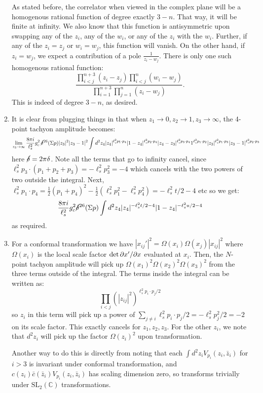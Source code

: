 \documentclass[11pt, class=article, crop=false]{standalone}
\begin{document}
\begin{enumerate}
 As stated before, the correlator when viewed in the complex plane will be a homogenous rational function of degree exactly $3-n$. That way, it will be finite at infinity. We also know that this function is antisymmetric upon swapping any of the $z_i$, any of the $w_i$, or any of the $z_i$ with the $w_i$. Further, if any of the $z_i = z_j$ or $w_i = w_j$, this function will vanish. On the other hand, if $z_i = w_j$, we expect a contribution of a pole $\frac1{z_i-w_j}$. There is only one such homogenous rational function:
 	\[
 		\frac{\prod_{i < j}^{n+3} (z_i - z_j) \prod_{i<j}^{n} (w_i - w_j)}{\prod_{i=1}^{n+3} \prod_{j=1}^n (z_i - w_j)}.
 	\]
 	This is indeed of degree $3-n$, as desired.
	
	\item It is clear from plugging things in that when $z_1 \to 0, z_2 \to 1, z_3 \to \infty$, the 4-point tachyon amplitude becomes:
	\[
		\lim_{z_3 \to \infty} \frac{8 \pi i}{\ell_s^2} g_c^2\,  \cancel\delta^{26}(\Sigma p) |z_3|^2 |z_3-1|^2 \int d^2 z_4 |z_4|^{\ell_s^2 p_1 \cdot p_4} |1-z_4|^{\ell_s^2 p_2 \cdot p_4} |z_4 - z_3|^{\ell_s^2 p_3 \cdot p_4} 1^{\ell_s^2 p_1 \cdot p_2}|z_3|^{\ell_s^2 p_1 \cdot p_3} |z_3 - 1|^{\ell_s^2 p_2 \cdot p_3} 
	\]
	here $\cancel\delta = 2 \pi \delta$. 
	Note all the terms that go to infinity cancel, since $\ell_s^2 p_3 \cdot (p_1 + p_2 + p_3) = -\ell_s^2 p_3^2 = -4$ which cancels with the two powers of two outside the integral. Next, $\ell_s^2 p_1 \cdot p_4 = \frac12 (p_1 + p_4)^2 - \frac12(\ell_s^2 p_1^2 - \ell_s^2 p_4^2) = -\ell_s^2 t/2 - 4$ etc so we get:
	\[
		\frac{8 \pi i}{\ell_s^2} g_c^2 \cancel\delta^{26}(\Sigma p) \int d^2 z_4 |z_4|^{-\ell_s^2 t/2- 4} |1-z_4|^{-\ell_s^2 u/2 - 4} 
	\]
	as required. 
	
	\item For a conformal transformation we have $|x_{ij}'|^2 = \Omega(x_i) \Omega(x_j) |x_{ij}|^2$ where $\Omega(x_i)$ is the local scale factor $\det \partial x'/\partial x$ evaluated at $x_i$. Then, the $N$-point tachyon amplitude will pick up $\Omega(x_1)^2 \Omega(x_2)^2 \Omega(x_3)^2$ from the three terms outside of the integral. The terms inside the integral can be written as:
	\[
		\prod_{i < j} (|z_{ij}|^2)^{\ell_s^2 p_i \cdot p_j/2}
	\]
	so $z_i$ in this term will pick up a power of $\sum_{j \neq i} \ell_s^2 p_i \cdot p_j/2 = -\ell_s^2 p_j^2 / 2 = -2$ on its scale factor. This exactly cancels for $z_1, z_2, z_3$. For the other $z_i$, we note that $d^2 z_i$ will pick up the factor $\Omega(z_i)^{2}$ upon transformation. 
	
	Another way to do this is directly from noting that each $\int d^2 z_i V_{p_i} (z_i, \bar z_i)$ for $i > 3$ is invariant under conformal transformation, and $c(z_i) \bar c(\bar z_i) V_{p_i}(z_i, \bar z_i)$ has scaling dimension zero, so transforms trivially under $\mathrm{SL}_2 (\mathbb C)$ transformations. 
	

\end{enumerate}
\end{document}
